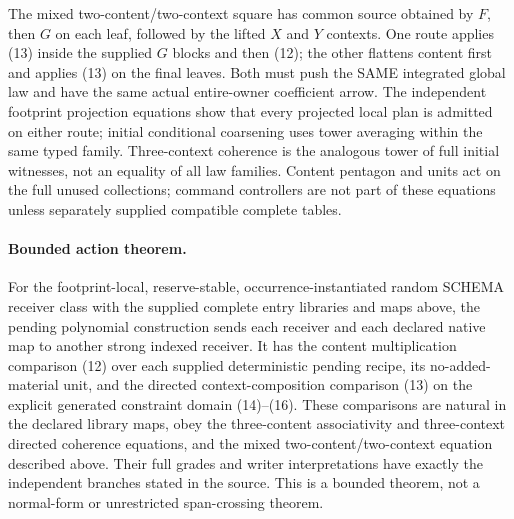 \documentclass[11pt]{article}
\begin{document}
The mixed two-content/two-context square has common source obtained by $F$, then $G$ on each leaf, followed by the lifted $X$ and $Y$ contexts. One route applies (13) inside the supplied $G$ blocks and then (12); the other flattens content first and applies (13) on the final leaves. Both must push the SAME integrated global law and have the same actual entire-owner coefficient arrow. The independent footprint projection equations show that every projected local plan is admitted on either route; initial conditional coarsening uses tower averaging within the same typed family. Three-context coherence is the analogous tower of full initial witnesses, not an equality of all law families. Content pentagon and units act on the full unused collections; command controllers are not part of these equations unless separately supplied compatible complete tables.

\paragraph{Bounded action theorem.}
For the footprint-local, reserve-stable, occurrence-instantiated random SCHEMA receiver class with the supplied complete entry libraries and maps above, the pending polynomial construction sends each receiver and each declared native map to another strong indexed receiver. It has the content multiplication comparison (12) over each supplied deterministic pending recipe, its no-added-material unit, and the directed context-composition comparison (13) on the explicit generated constraint domain (14)--(16). These comparisons are natural in the declared library maps, obey the three-content associativity and three-context directed coherence equations, and the mixed two-content/two-context equation described above. Their full grades and writer interpretations have exactly the independent branches stated in the source. This is a bounded theorem, not a normal-form or unrestricted span-crossing theorem.
\end{document}
